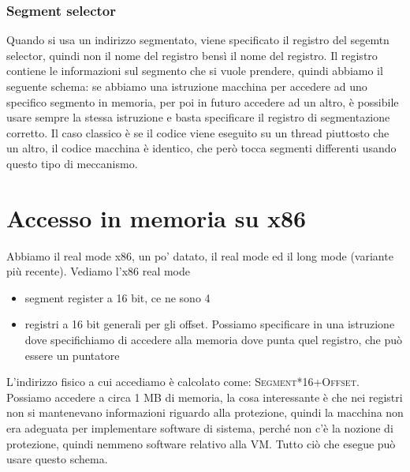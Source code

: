 \documentclass[12pt, oneside]{extbook}
\begin{document}
\subsubsection{Segment selector}
Quando si usa un indirizzo segmentato, viene specificato il registro del segemtn selector, quindi non il nome del registro bensì il nome del registro. Il registro contiene le informazioni sul segmento che si vuole prendere, quindi abbiamo il seguente schema:
se abbiamo una istruzione macchina per accedere ad uno specifico segmento in memoria, per poi in futuro accedere ad un altro, è possibile usare sempre la stessa istruzione e basta specificare il registro di segmentazione corretto. Il caso classico è se il codice viene eseguito su un thread piuttosto che un altro, il codice macchina è identico, che però tocca segmenti differenti usando questo tipo di meccanismo.
\section{Accesso in memoria su x86}
Abbiamo il real mode x86, un po' datato, il real mode ed il long mode (variante più recente). Vediamo l'x86 real mode 
\begin{itemize}
\item segment register a 16 bit, ce ne sono 4
\item registri a 16 bit generali per gli offset. Possiamo specificare in una istruzione dove specifichiamo di accedere alla memoria dove punta quel registro, che può essere un puntatore
\end{itemize}
L'indirizzo fisico a cui accediamo è calcolato come: \textsc{Segment}*16+\textsc{Offset}. Possiamo accedere a circa 1 MB di memoria, la cosa interessante è che nei registri non si mantenevano informazioni riguardo alla protezione, quindi la macchina non era adeguata per implementare software di sistema, perché non c'è la nozione di protezione, quindi nemmeno software relativo alla VM. Tutto ciò che esegue può usare questo schema.
\end{document}
